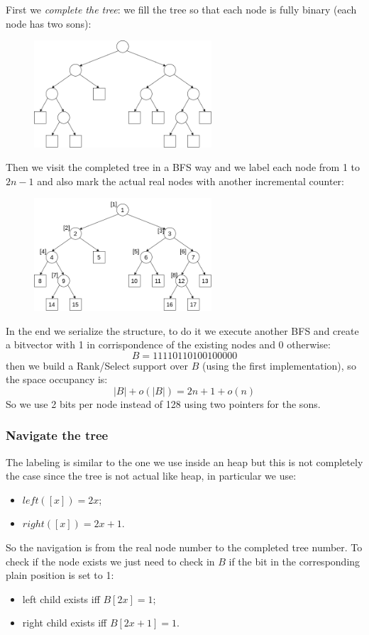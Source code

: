 First we \emph{complete the tree}: we fill the tree so that each node is fully binary (each node has two sons):
\begin{figure}[H]
    \centering
    \includegraphics[width=250px]{images/10_Data_compression/poitnerless_programming_complete.png}
\end{figure}

Then we visit the completed tree in a BFS way and we label each node from 1 to $2n-1$ and also mark the actual real nodes with another incremental counter:
\begin{figure}[H]
    \centering
    \includegraphics[width=250px]{images/10_Data_compression/pointerless_labeled.png}
\end{figure}

In the end we serialize the structure, to do it we execute another BFS and create a bitvector with 1 in corrispondence of the existing nodes and 0 otherwise:
$$
    B = 11110110100100000
$$
then we build a Rank/Select support over $B$ (using the first implementation), so the space occupancy is:
$$
 |B| + o(|B|) = 2n + 1 + o(n)
$$
So we use 2 bits per node instead of 128 using two pointers for the sons.

\subsubsection{Navigate the tree}
The labeling is similar to the one we use inside an heap but this is not completely the case since the tree is not actual like heap, in particular we use:
\begin{itemize}
    \item $left([x]) = 2x$;
    \item $right([x]) = 2x + 1$.
\end{itemize}
So the navigation is from the real node number to the completed tree number.
To check if the node exists we just need to check in $B$ if the bit in the corresponding plain position is set to 1:
\begin{itemize}
    \item left child exists iff $B[2x] = 1$;
    \item right child exists iff $B[2x+1] = 1$.
\end{itemize}

